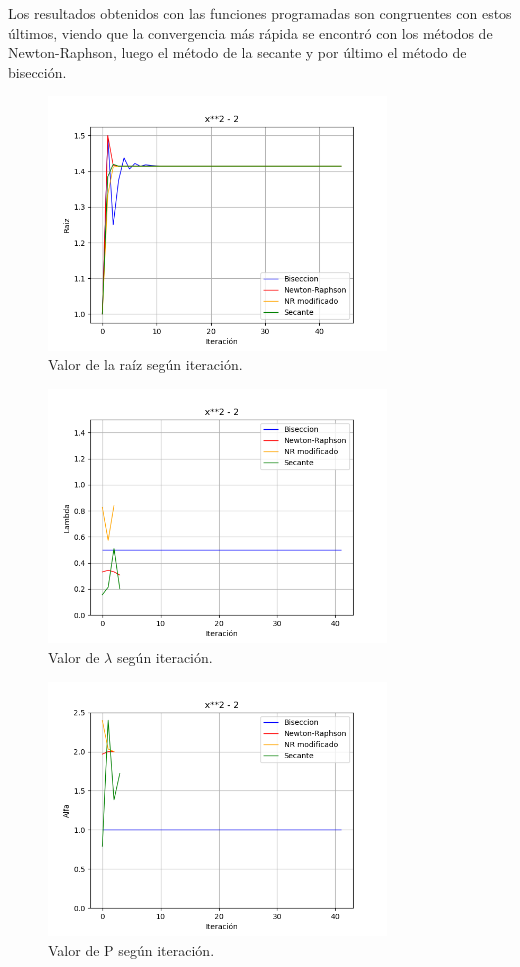 \documentclass[titlepage,a4paper]{article}
\begin{document}
Los resultados obtenidos con las funciones programadas son congruentes con estos últimos, viendo que la convergencia más rápida se encontró con los métodos de Newton-Raphson, luego el método de la secante y por último el método de bisección.

\begin{figure}[H]
\centering
\includegraphics[width=0.8\textwidth]{raiz f1.png}
\caption{\label{fig:raizf1}Valor de la raíz según iteración.}
\end{figure}

\begin{figure}[H]
    \centering
    \includegraphics[width=0.8\textwidth]{lambda f1.png}
    \caption{\label{fig:lambdaf1}Valor de $\lambda$ según iteración.}
\end{figure}
\begin{figure}[H]
    \centering
    \includegraphics[width=0.8\textwidth]{alfa f1.png}
    \caption{\label{fig:alfaf1}Valor de P según iteración.}
\end{figure}
\end{document}
